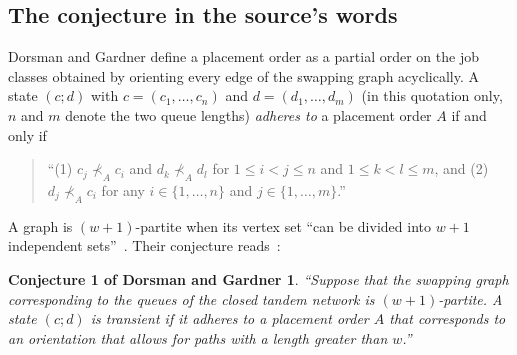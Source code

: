 \documentclass[11pt,a4paper]{article}
\theoremstyle{plain}
\newtheorem*{dgconj}{Conjecture 1 of Dorsman and Gardner}
\theoremstyle{plain}
\begin{document}
\subsection{The conjecture in the source's words}\label{sec:conj}

Dorsman and Gardner define a placement order as a partial order on the job classes obtained by orienting every edge of the swapping graph acyclically. A state $(c;d)$ with $c=(c_1,\dots,c_n)$ and $d=(d_1,\dots,d_m)$ (in this quotation only, $n$ and $m$ denote the two queue lengths) \emph{adheres to} a placement order $A$ if and only if~\cite[Section~3.1]{DG2024}
\begin{quote}
``(1) $c_j\not\prec_A c_i$ and $d_k\not\prec_A d_l$ for $1\le i<j\le n$ and $1\le k<l\le m$, and (2) $d_j\not\prec_A c_i$ for any $i\in\{1,\dots,n\}$ and $j\in\{1,\dots,m\}$.''
\end{quote}
A graph is $(w+1)$-partite when its vertex set ``can be divided into $w+1$ independent sets''~\cite[Section~5.2.2]{DG2024}. Their conjecture reads~\cite[Section~5.2.2]{DG2024}:

\begin{dgconj}
``Suppose that the swapping graph corresponding to the queues of the closed tandem network is $(w+1)$-partite. A state $(c;d)$ is transient if it adheres to a placement order $A$ that corresponds to an orientation that allows for paths with a length greater than $w$.''
\end{dgconj}
\end{document}
